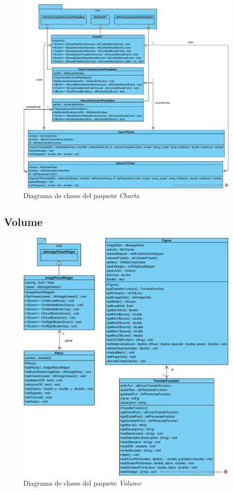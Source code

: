 \begin{figure}[H]
	\centering
	\includegraphics[width=12.5cm]{imagenes/diagramas/clases/Charts}
	\caption{Diagrama de clases del paquete \textit{Charts}}
	\label{fig:diagrama_clases_charts}
\end{figure}

\subsection{Volume}

\begin{figure}[H]
	\centering
	\includegraphics[width=12.5cm]{imagenes/diagramas/clases/Volume}
	\caption{Diagrama de clases del paquete \textit{Volume}}
	\label{fig:diagrama_clases_volume}
\end{figure}

